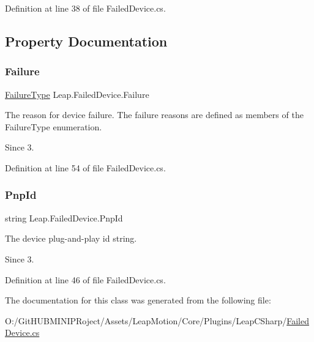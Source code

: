 Definition at line 38 of file Failed\+Device.\+cs.



\subsection{Property Documentation}
\mbox{\label{class_leap_1_1_failed_device_a13be15f5e378c194ddcd0a4098d2d3fc}} 
\subsubsection{\texorpdfstring{Failure}{Failure}}
{\footnotesize\ttfamily \mbox{\hyperlink{class_leap_1_1_failed_device_a2737c8ecbc644f3d14200183fe08c3a9}{Failure\+Type}} Leap.\+Failed\+Device.\+Failure\hspace{0.3cm}{\ttfamily [get]}}



The reason for device failure. The failure reasons are defined as members of the Failure\+Type enumeration. 

\begin{DoxySince}{Since}
3. 
\end{DoxySince}


Definition at line 54 of file Failed\+Device.\+cs.

\mbox{\label{class_leap_1_1_failed_device_a56b58cdaa74dae4bc05b229c2ffdea0e}} 
\subsubsection{\texorpdfstring{PnpId}{PnpId}}
{\footnotesize\ttfamily string Leap.\+Failed\+Device.\+Pnp\+Id\hspace{0.3cm}{\ttfamily [get]}}



The device plug-\/and-\/play id string. 

\begin{DoxySince}{Since}
3. 
\end{DoxySince}


Definition at line 46 of file Failed\+Device.\+cs.



The documentation for this class was generated from the following file\+:\begin{DoxyCompactItemize}
\item 
O\+:/\+Git\+H\+U\+B\+M\+I\+N\+I\+P\+Roject/\+Assets/\+Leap\+Motion/\+Core/\+Plugins/\+Leap\+C\+Sharp/\mbox{\hyperlink{_failed_device_8cs}{Failed\+Device.\+cs}}\end{DoxyCompactItemize}
